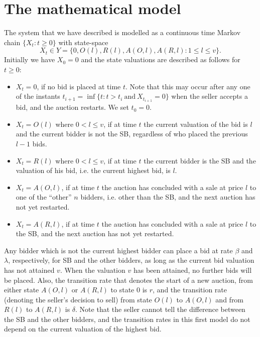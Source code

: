 \documentclass{article}
\begin{document}
\section{The mathematical model} \label{Model}

The system that we have described is modelled as a continuous time
Markov chain $\{X_t : t \geq 0\}$ with state-space
\begin{equation}\label{eq:statespaceY}
X_t\in Y =\{0, O(l),R(l),A(O,l),A(R,l):1\leq l \leq v\}.
\end{equation}
Initially we have $X_0=0$ and the state valuations are described
as follows for $t\geq 0$:
\begin{itemize}
\item $X_{t}=0$, if no bid is placed at time $t$. Note that this
may occur after any one of the instants
$t_{i+1}=\inf\{t:t>t_i~\textrm{and}~X_{t_{i+1}}=0\}$ when the
seller accepts a bid, and the auction restarts. We set $t_0=0$.

\item $X_{t}=O(l)$ where $0 < l\leq v$, if at time $t$ the current
valuation of the bid is $l$ and the current bidder is not the SB,
regardless of who placed the previous $l-1$ bids.

\item $X_{t}=R(l)$ where $0 < l\leq v$, if at time $t$ the current
bidder is the SB and the valuation of his bid, i.e. the current
highest bid, is $l$.

\item $X_{t}=A(O,l)$, if at time $t$ the auction has concluded
with a sale at price $l$ to one of the ``other'' $n$ bidders, i.e.
other than the SB, and the next auction has not yet restarted.

\item $X_{t}=A(R,l)$, if at time $t$ the auction has concluded
with a sale at price $l$ to the SB, and the next auction has not
yet restarted.

\end{itemize}
Any bidder which is not the current highest bidder can place a bid
at rate $\beta$ and $\lambda$, respectively, for SB and the other
bidders, as long as the current bid valuation has not attained
$v$. When the valuation $v$ has been attained, no further bids
will be placed. Also, the transition rate that denotes the start
of a new auction, from either state $A(O,l)$ or $A(R,l)$ to state
$0$ is $r$, and  the transition rate (denoting the seller's
decision to sell) from state $O(l)$ to $A(O,l)$ and from $R(l)$ to
$A(R,l)$ is $\delta$. Note that the seller cannot tell the
difference between the SB and the other bidders, and the
transition rates in this first model do not depend on the current
valuation of the highest bid.
\end{document}
